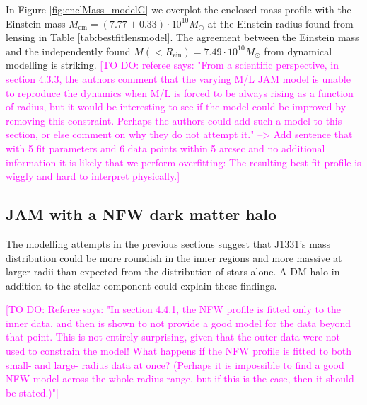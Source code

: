\documentclass[useAMS,usenatbib]{mnras}
\newcommand{\Wilma}[1]{\textcolor{Magenta}{#1}}
\begin{document}
In Figure \ref{fig:enclMass_modelG} we overplot the enclosed mass profile with the Einstein mass $M_\text{ein} = (7.77 \pm 0.33) \cdot 10^{10} M_\odot$ at the Einstein radius found from lensing in Table \ref{tab:bestfitlensmodel}. The agreement between the Einstein mass and the independently found $M(<R_\text{ein}) = 7.49 \cdot 10^{10} M_\odot$ from dynamical modelling is striking.
\Wilma{[TO DO: referee says: "From a scientific perspective, in section 4.3.3, the authors comment that the
varying M/L JAM model is unable to reproduce the dynamics when M/L is forced to be
always rising as a function of radius, but it would be interesting to see if the
model could be improved by removing this constraint. Perhaps the authors could add
such a model to this section, or else comment on why they do not attempt it." --> Add sentence that with 5 fit parameters and 6 data points within 5 arcsec and no additional information it is likely that we perform overfitting: The resulting best fit profile is wiggly and hard to interpret physically.]}

\subsection{JAM with a NFW dark matter halo} \label{sec:results_JAM_NFW}

The modelling attempts in the previous sections suggest that J1331's mass distribution could be more roundish in the inner regions and more massive at larger radii than expected from the distribution of stars alone. A DM halo in addition to the stellar component could explain these findings. 

\Wilma{[TO DO: Referee says: "In section 4.4.1, the NFW profile is fitted only to the inner data, and then is
shown to not provide a good model for the data beyond that point. This is not
entirely surprising, given that the outer data were not used to constrain the model!
What happens if the NFW profile is fitted to both small- and large- radius data at
once? (Perhaps it is impossible to find a good NFW model across the whole radius
range, but if this is the case, then it should be stated.)"]}
\end{document}
